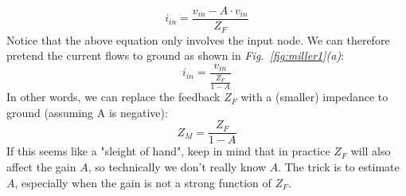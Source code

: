     \begin{equation}
        i_{in} = \frac{ v_{in} - A\cdot v_{in} }{Z_F}
    \end{equation}
Notice that the above equation only involves the input node.  We can therefore pretend the current flows to ground as shown in \emph{Fig.~\ref{fig:miller1}(a)}:
    \begin{equation}
        i_{in} = \frac{v_{in}}{\frac{Z_F}{1 - A}}
    \end{equation}
In other words, we can replace the feedback $Z_F$ with a (smaller) impedance to ground (assuming A is negative):
    \begin{equation}
        Z_M = \frac{Z_F}{1 - A}
    \end{equation}
If this seems like a "sleight of hand", keep in mind that in practice $Z_F$ will also affect the gain $A$, so technically we don't really know $A$. The trick is to estimate $A$, especially when the gain is not a strong function of $Z_F$.
